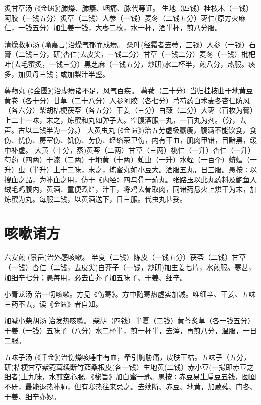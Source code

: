\documentclass[a4paper,12pt,UTF8,twoside]{ctexbook}
\begin{document}
    炙甘草汤
    (《金匮》)肺燥、肺痿、咽痛、脉代等证。
    生地（四钱）桂枝木（一钱）阿胶（一钱五分）炙草（二钱）人参（一钱）麦冬（二钱五分）枣仁(原方火麻仁，一钱五分）加生姜一钱，大枣二枚，水一杯，酒半杯，煎八分服。
    
    清燥救肺汤
    (喻嘉言)治燥气郁而成痨。
    桑叶(经霜者去蒂，三钱）人参（一钱）石膏（二钱三分，研)杏仁(去皮尖，一钱二分）甘草（一钱二分）麦冬（一钱）枇杷叶(去毛蜜炙，一钱三分）黑芝麻（一钱五分，炒研)水二杯半，煎八分，热服。痰多，加贝母三钱；或加梨汁半盏。
    
    薯蓣丸
    (《金匮》)治虚痨诸不足，风气百疾。
    薯蓣（三十分）当归桂枝曲干地黄豆黄卷（各十分）甘草（二十八分）人参阿胶（各七分）芎芍药白术麦冬杏仁防风（各六分）柴胡桔梗茯苓（各五分）干姜（三分）白蔹（二分）大枣（百枚为膏）上二十一味，末之，炼蜜和丸如弹子大。空腹酒服一丸，一百丸为剂。（分，去声。古以二钱半为一分。）
    大黄虫丸
    (《金匮》)治五劳虚极羸瘦，腹满不能饮食，食伤、忧伤、房室伤、饥伤、劳伤、经络荣卫伤，内有干血，肌肉甲错，目黯黑，缓中补虚。
    大黄（十分，蒸)黄芩（二两）甘草（三两）桃仁（一升）杏仁（一升）芍药（四两）干漆（二两）干地黄（十两）虻虫（一升）水蛭（一百个）蛴螬（一升）虫（半升）上十二味，末之，炼蜜丸如小豆大。酒服五丸，日三服。愚按∶以搜血之品，为补血之用，仿于《内经》四乌骨一茹丸。张路玉以此丸药料及鲍鱼入绒毛鸡腹内，黄酒、童便煮烂，汁干，将鸡去骨取肉，同诸药悬火上烘干为末，加炼蜜为丸。每服二钱，以黄酒送下，日三服。代虫丸甚妥。
        
    \chapter{咳嗽诸方}	
    
    六安煎
    (景岳)治外感咳嗽。
    半夏（二钱）陈皮（一钱五分）茯苓（二钱）甘草（一钱）杏仁（二钱，去皮尖)白芥子（一钱，炒研)加生姜七片，水煎服。寒甚，加细辛七分；愚每用，必去白芥子加五味子、干姜、细辛。
    
    小青龙汤
    治一切咳嗽。方见《伤寒》。方中随寒热虚实加减。唯细辛、干姜、五味三药不去，读《金匮》者自知。
    
    加减小柴胡汤
    治发热咳嗽。
    柴胡（四钱）半夏（二钱）黄芩炙草（各一钱五分）干姜（一钱）五味子（八分）水二杯半，煎一杯半，去滓，再煎八分，温服，一日二服。
    
    五味子汤
    (《千金》)治伤燥咳唾中有血，牵引胸胁痛，皮肤干枯。五味子（五分，研)桔梗甘草紫菀茸续断竹茹桑根皮(各一钱）生地黄(二钱）赤小豆(一撮即赤豆之细者)上九味，水煎空心服。《秘旨》加白蜜一匙。愚按∶赤豆易生扁豆五钱，囫囵不研，最能退热补肺，但有寒热往来忌之。去续断、赤豆、地黄，加葳蕤、门冬、干姜、细辛亦妙。
    
\end{document}

